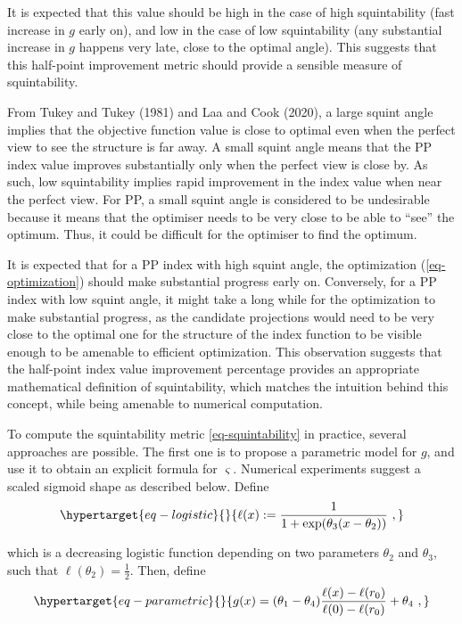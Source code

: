 \documentclass[
  12pt,
]{interact}
\theoremstyle{plain}
\begin{document}
It is expected that this value should be high in the case of high
squintability (fast increase in \(g\) early on), and low in the case of
low squintability (any substantial increase in \(g\) happens very late,
close to the optimal angle). This suggests that this half-point
improvement metric should provide a sensible measure of squintability.

From Tukey and Tukey (1981) and Laa and Cook (2020), a large squint
angle implies that the objective function value is close to optimal even
when the perfect view to see the structure is far away. A small squint
angle means that the PP index value improves substantially only when the
perfect view is close by. As such, low squintability implies rapid
improvement in the index value when near the perfect view. For PP, a
small squint angle is considered to be undesirable because it means that
the optimiser needs to be very close to be able to ``see'' the optimum.
Thus, it could be difficult for the optimiser to find the optimum.

It is expected that for a PP index with high squint angle, the
optimization (\ref{eq-optimization}) should make substantial progress
early on. Conversely, for a PP index with low squint angle, it might
take a long while for the optimization to make substantial progress, as
the candidate projections would need to be very close to the optimal one
for the structure of the index function to be visible enough to be
amenable to efficient optimization. This observation suggests that the
half-point index value improvement percentage provides an appropriate
mathematical definition of squintability, which matches the intuition
behind this concept, while being amenable to numerical computation.

To compute the squintability metric \eqref{eq-squintability} in
practice, several approaches are possible. The first one is to propose a
parametric model for \(g\), and use it to obtain an explicit formula for
\(\varsigma\). Numerical experiments suggest a scaled sigmoid shape as
described below. Define
\begin{equation}\protect\hypertarget{eq-logistic}{}{
\ell(x):=\frac{1}{1+\exp(\theta_{3}(x-\theta_{2}))}\ ,
}\label{eq-logistic}\end{equation}

which is a decreasing logistic function depending on two parameters
\(\theta_2\) and \(\theta_3\), such that
\(\ell(\theta_{2})=\frac{1}{2}\). Then, define
\begin{equation}\protect\hypertarget{eq-parametric}{}{
g(x)=(\theta_{1}-\theta_{4})\frac{\ell(x)-\ell(r_0)}{\ell(0)-\ell(r_0)}+\theta_{4}\ ,
}\label{eq-parametric}\end{equation}
\end{document}
